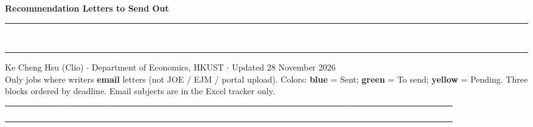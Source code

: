 \documentclass[10pt,landscape,letterpaper]{article}
\newcommand{\headercell}[1]{\textcolor{white}{\bfseries #1}}
\begin{document}
{\color{headerblue}\LARGE\bfseries Recommendation Letters to Send Out}\\[-0.2em]
{\color{headerblue}\rule{\textwidth}{1.6pt}}\\[-0.4em]
{\color{headerblue}\rule{\textwidth}{0.4pt}}
\vspace{0.25em}
{\color{subheader}\scriptsize Ke Cheng Hsu (Clio) $\cdot$ Department of Economics, HKUST $\cdot$ Updated 28 November 2026}\\[0.1em]
{\scriptsize Only jobs where writers \textbf{email} letters (not JOE / EJM / portal upload). Colors: \textbf{blue} = Sent; \textbf{green} = To send; \textbf{yellow} = Pending. Three blocks ordered by deadline. Email subjects are in the Excel tracker only.}
\vspace{0.35em}
\scriptsize
\begin{tabularx}{\textwidth}{@{}>{\raggedright\arraybackslash}p{4.3cm}>{\raggedright\arraybackslash}p{1.7cm}>{\raggedright\arraybackslash}p{1.45cm}>{\raggedright\arraybackslash}p{1.9cm}>{\raggedright\arraybackslash}p{3.0cm}>{\raggedright\arraybackslash}X>{\raggedright\arraybackslash}p{2.3cm}>{\raggedright\arraybackslash}p{1.05cm}>{\raggedright\arraybackslash}p{0.75cm}@{}}
\rowcolor{headerblue}
\headercell{Institution} & \headercell{Position} & \headercell{Deadline} & \headercell{How to apply} & \headercell{Email / contact} & \headercell{Materials} & \headercell{Referees} & \headercell{Status} & \headercell{Sent?} \\


\end{tabularx}
\end{document}
